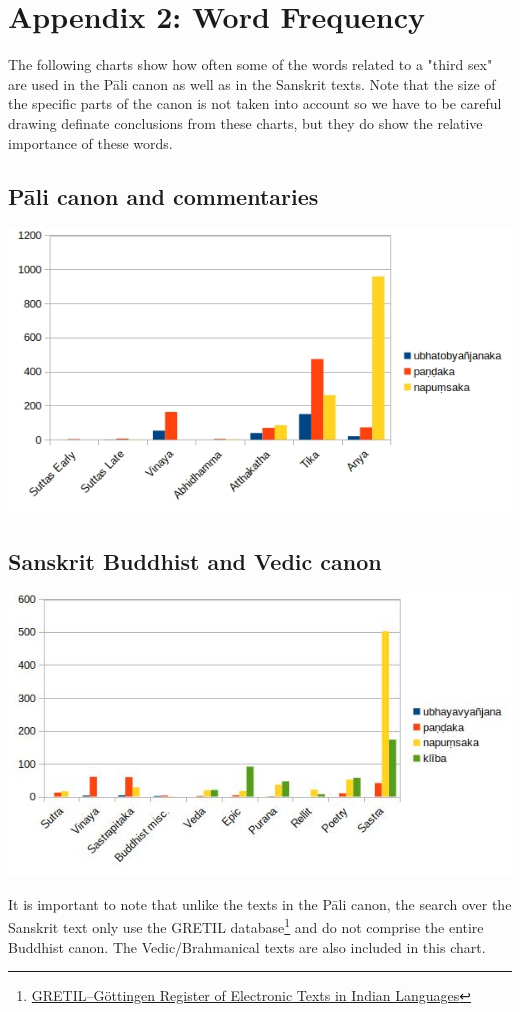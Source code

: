 \section{Appendix 2: Word Frequency}
\label{appendix2}

The following charts show how often some of the words related to a "third sex" are used in the Pāli canon as well as in the Sanskrit texts. Note that the size of the specific parts of the canon is not taken into account so we have to be careful drawing definate conclusions from these charts, but they do show the relative importance of these words. 

\subsection{Pāli canon and commentaries}

\includegraphics[width=0.7\linewidth]{pali.jpg}
\label{pali1}

\subsection{Sanskrit Buddhist and Vedic canon}

\includegraphics[width=0.7\linewidth]{sanskrit.jpg}
\label{sanskrit1}

\medskip
It is important to note that unlike the texts in the Pāli canon, the search over the Sanskrit text only use the GRETIL database\footnote{\href{http://gretil.sub.uni-goettingen.de/gretil.html}{GRETIL--Göttingen Register of Electronic Texts in Indian Languages}} and do not comprise the entire Buddhist canon. The Vedic/Brahmanical texts are also included in this chart.
